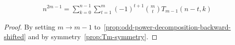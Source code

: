 \begin{corollary}
    \label{cor:odd-power-decomposition-m-1-shifted}
    \begin{align*}
        n^{2m-1} = \sum_{k=0}^{n-1} \sum_{t=1}^{m} (-1)^{t+1} \binom{m}{t} T_{m-1} (n-t, k)
    \end{align*}
    \begin{proof}
        By setting $m \rightarrow m-1$ to~\eqref{prop:odd-power-decomposition-backward-shifted}
        and by symmetry~\eqref{prop:Tm-symmetry}.
    \end{proof}
\end{corollary}
